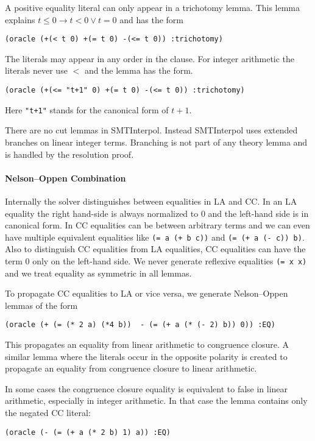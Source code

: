 \documentclass[a4paper]{article}
\newcommand\si{SMTInterpol\xspace}
\begin{document}
A positive equality literal can only appear in a trichotomy lemma.
This lemma explains $t \leq 0 \rightarrow t < 0 \lor t=0$ and has the form
\begin{verbatim}
(oracle (+(< t 0) +(= t 0) -(<= t 0)) :trichotomy)
\end{verbatim}
The literals may appear in any order in the clause.  For integer
arithmetic the literals never use $<$ and the lemma has the form.
\begin{verbatim}
(oracle (+(<= "t+1" 0) +(= t 0) -(<= t 0)) :trichotomy)
\end{verbatim}
Here \verb|"t+1"| stands for the canonical form of $t+1$.

There are no cut lemmas in \si.  Instead \si uses extended branches on
linear integer terms.  Branching is not part of any theory lemma and
is handled by the resolution proof.

\paragraph{Nelson--Oppen Combination}

Internally the solver distinguishes between equalities in LA and CC.
In an LA equality the right hand-side is always normalized to 0 and
the left-hand side is in canonical form.  In CC equalities can be
between arbitrary terms and we can even have multiple equivalent equalities
like \verb|(= a (+ b c))|  and \verb|(= (+ a (- c)) b)|.   Also to distinguish
CC equalities from LA equalities, CC equalities can have the term 0 only
on the left-hand side.  We never generate reflexive equalities \verb|(= x x)| and
we treat equality as symmetric in all lemmas.

To propagate CC equalities to LA or vice versa, we generate Nelson--Oppen
lemmas of the form
\begin{verbatim}
(oracle (+ (= (* 2 a) (*4 b))  - (= (+ a (* (- 2) b)) 0)) :EQ)
\end{verbatim}
This propagates an equality from linear arithmetic to congruence
closure.  A similar lemma where the literals occur in the opposite
polarity is created to propagate an equality from congruence closure
to linear arithmetic.

In some cases the congruence closure equality is equivalent to false
in linear arithmetic, especially in integer arithmetic. In that case the
lemma contains only the negated CC literal:
\begin{verbatim}
(oracle (- (= (+ a (* 2 b) 1) a)) :EQ)
\end{verbatim}
\end{document}
